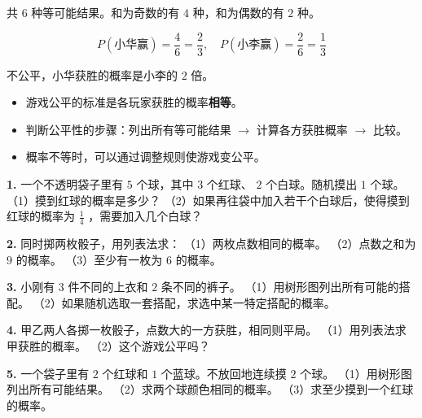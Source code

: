 \begin{workedexamples}
共 $6$ 种等可能结果。和为奇数的有 $4$ 种，和为偶数的有 $2$ 种。

\[
P(\text{小华赢}) = \frac{4}{6} = \frac{2}{3}, \quad P(\text{小李赢}) = \frac{2}{6} = \frac{1}{3}
\]


不公平，小华获胜的概率是小李的 $2$ 倍。

\end{workedexamples}

\begin{keytakeaway}


\begin{itemize}
  \item 游戏公平的标准是各玩家获胜的概率\textbf{相等}。
  \item 判断公平性的步骤：列出所有等可能结果 $\to$ 计算各方获胜概率 $\to$ 比较。
  \item 概率不等时，可以通过调整规则使游戏变公平。
\end{itemize}


\end{keytakeaway}

\begin{practice}


\textbf{1.} 一个不透明袋子里有 $5$ 个球，其中 $3$ 个红球、 $2$ 个白球。随机摸出 $1$ 个球。
（1）摸到红球的概率是多少？
（2）如果再往袋中加入若干个白球后，使得摸到红球的概率为 $\frac{1}{4}$ ，需要加入几个白球？

\textbf{2.} 同时掷两枚骰子，用列表法求：
（1）两枚点数相同的概率。
（2）点数之和为 $9$ 的概率。
（3）至少有一枚为 $6$ 的概率。

\textbf{3.} 小刚有 $3$ 件不同的上衣和 $2$ 条不同的裤子。
（1）用树形图列出所有可能的搭配。
（2）如果随机选取一套搭配，求选中某一特定搭配的概率。

\textbf{4.} 甲乙两人各掷一枚骰子，点数大的一方获胜，相同则平局。
（1）用列表法求甲获胜的概率。
（2）这个游戏公平吗？

\textbf{5.} 一个袋子里有 $2$ 个红球和 $1$ 个蓝球。不放回地连续摸 $2$ 个球。
（1）用树形图列出所有可能结果。
（2）求两个球颜色相同的概率。
（3）求至少摸到一个红球的概率。

\end{practice}



